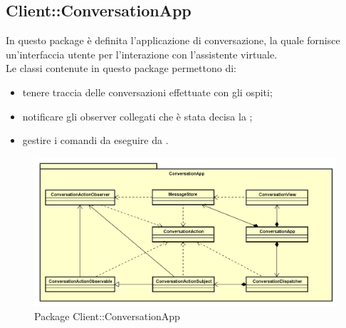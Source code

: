 \subsection{Client::ConversationApp}
In questo package è definita l'applicazione di conversazione, la quale fornisce un'interfaccia utente per l'interazione con l'assistente virtuale.\\ Le classi contenute in questo package permettono di: \begin{itemize} \item tenere traccia delle conversazioni effettuate con gli ospiti; \item notificare gli observer collegati che è stata decisa la ; \item gestire i comandi da eseguire da . \end{itemize}
\begin{figure}[h] \centering \includegraphics[width=\textwidth,height=\textheight,keepaspectratio]{images/diagrams/client/Client/ConversationApp.png}
	\caption{Package Client::ConversationApp}
\end{figure}
\newpage

